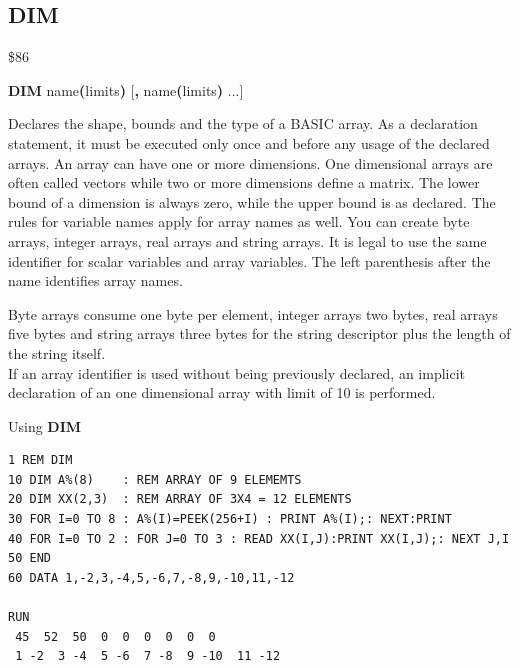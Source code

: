 
\newpage
\subsection{DIM}
\begin{description}[leftmargin=2cm,style=nextline]
\item [Token:] \$86
\item [Format:] {\bf DIM} name{\bf(}limits{\bf)} [{\bf,} name{\bf(}limits{\bf)} ...]
\item [Usage:] Declares the shape,
               bounds and the type of a BASIC array.
               As a declaration statement, it must be executed
               only once and before any usage of the declared arrays.
               An array can have one or more dimensions.
               One dimensional arrays are often called vectors
               while two or more dimensions define a matrix.
               The lower bound of a dimension is always zero,
               while the upper bound is as declared. The rules for
               variable names apply for array names as well.
               You can create byte arrays, integer arrays, real arrays and string arrays.
               It is legal to use the same identifier for scalar
               variables and array variables. The left parenthesis
               after the name identifies array names.

\item [Remarks:] Byte arrays consume one byte per element, integer arrays two bytes,
                 real arrays five bytes and string arrays three bytes
                 for the string descriptor plus
                 the length of the string itself. \\
                 If an array identifier is used without being previously
                 declared, an implicit declaration of an
                 one dimensional array with limit of 10 is performed.

\item [Example:] Using {\bf DIM}
\begin{tcolorbox}[colback=black,coltext=white]
\verbatimfont{\codefont}
\begin{verbatim}
1 REM DIM
10 DIM A%(8)    : REM ARRAY OF 9 ELEMEMTS
20 DIM XX(2,3)  : REM ARRAY OF 3X4 = 12 ELEMENTS
30 FOR I=0 TO 8 : A%(I)=PEEK(256+I) : PRINT A%(I);: NEXT:PRINT
40 FOR I=0 TO 2 : FOR J=0 TO 3 : READ XX(I,J):PRINT XX(I,J);: NEXT J,I
50 END
60 DATA 1,-2,3,-4,5,-6,7,-8,9,-10,11,-12

RUN
 45  52  50  0  0  0  0  0  0
 1 -2  3 -4  5 -6  7 -8  9 -10  11 -12
\end{verbatim}
\end{tcolorbox}
\end{description}

